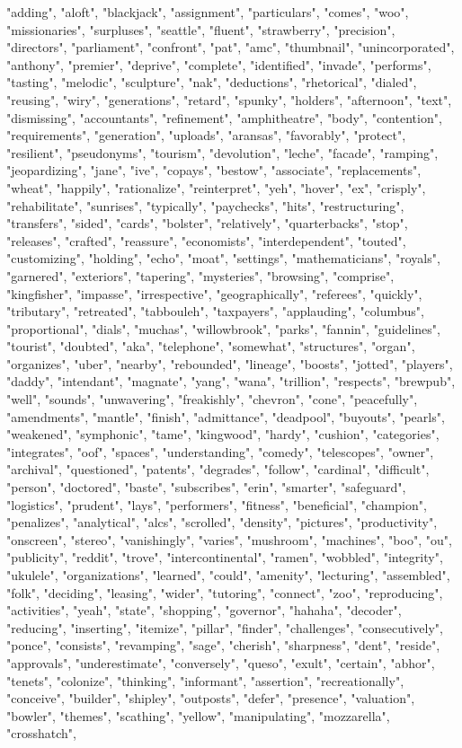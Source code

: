 "adding", "aloft", "blackjack", "assignment", "particulars", "comes", "woo", "missionaries", "surpluses", "seattle", "fluent", "strawberry", "precision", "directors", "parliament", "confront", "pat", "amc", "thumbnail", "unincorporated", "anthony", "premier", "deprive", "complete", "identified", "invade", "performs", "tasting", "melodic", "sculpture", "nak", "deductions", "rhetorical", "dialed", "reusing", "wiry", "generations", "retard", "spunky", "holders", "afternoon", "text", "dismissing", "accountants", "refinement", "amphitheatre", "body", "contention", "requirements", "generation", "uploads", "aransas", "favorably", "protect", "resilient", "pseudonyms", "tourism", "devolution", "leche", "facade", "ramping", "jeopardizing", "jane", "ive", "copays", "bestow", "associate", "replacements", "wheat", "happily", "rationalize", "reinterpret", "yeh", "hover", "ex", "crisply", "rehabilitate", "sunrises", "typically", "paychecks", "hits", "restructuring", "transfers", "sided", "cards", "bolster", "relatively", "quarterbacks", "stop", "releases", "crafted", "reassure", "economists", "interdependent", "touted", "customizing", "holding", "echo", "moat", "settings", "mathematicians", "royals", "garnered", "exteriors", "tapering", "mysteries", "browsing", "comprise", "kingfisher", "impasse", "irrespective", "geographically", "referees", "quickly", "tributary", "retreated", "tabbouleh", "taxpayers", "applauding", "columbus", "proportional", "dials", "muchas", "willowbrook", "parks", "fannin", "guidelines", "tourist", "doubted", "aka", "telephone", "somewhat", "structures", "organ", "organizes", "uber", "nearby", "rebounded", "lineage", "boosts", "jotted", "players", "daddy", "intendant", "magnate", "yang", "wana", "trillion", "respects", "brewpub", "well", "sounds", "unwavering", "freakishly", "chevron", "cone", "peacefully", "amendments", "mantle", "finish", "admittance", "deadpool", "buyouts", "pearls", "weakened", "symphonic", "tame", "kingwood", "hardy", "cushion", "categories", "integrates", "oof", "spaces", "understanding", "comedy", "telescopes", "owner", "archival", "questioned", "patents", "degrades", "follow", "cardinal", "difficult", "person", "doctored", "baste", "subscribes", "erin", "smarter", "safeguard", "logistics", "prudent", "lays", "performers", "fitness", "beneficial", "champion", "penalizes", "analytical", "alcs", "scrolled", "density", "pictures", "productivity", "onscreen", "stereo", "vanishingly", "varies", "mushroom", "machines", "boo", "ou", "publicity", "reddit", "trove", "intercontinental", "ramen", "wobbled", "integrity", "ukulele", "organizations", "learned", "could", "amenity", "lecturing", "assembled", "folk", "deciding", "leasing", "wider", "tutoring", "connect", "zoo", "reproducing", "activities", "yeah", "state", "shopping", "governor", "hahaha", "decoder", "reducing", "inserting", "itemize", "pillar", "finder", "challenges", "consecutively", "ponce", "consists", "revamping", "sage", "cherish", "sharpness", "dent", "reside", "approvals", "underestimate", "conversely", "queso", "exult", "certain", "abhor", "tenets", "colonize", "thinking", "informant", "assertion", "recreationally", "conceive", "builder", "shipley", "outposts", "defer", "presence", "valuation", "bowler", "themes", "scathing", "yellow", "manipulating", "mozzarella", "crosshatch", 
